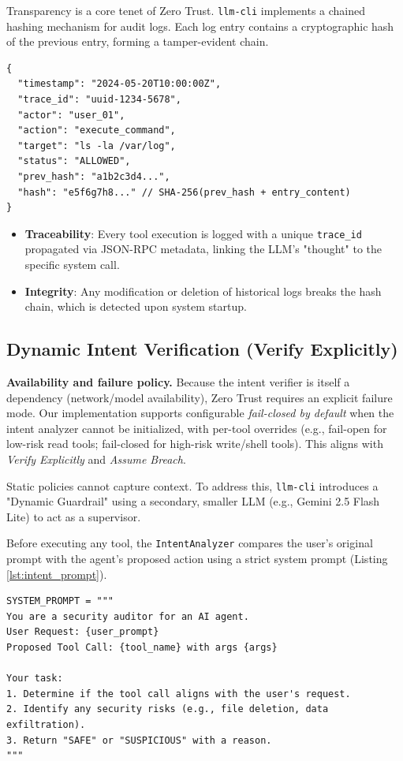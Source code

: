 \documentclass[conference]{IEEEtran}
\begin{document}
Transparency is a core tenet of Zero Trust. \texttt{llm-cli} implements a chained hashing mechanism for audit logs. Each log entry contains a cryptographic hash of the previous entry, forming a tamper-evident chain.

\begin{lstlisting}[caption={Audit Log Entry Structure with Chained Hashing}, label={lst:auditlog}]
{
  "timestamp": "2024-05-20T10:00:00Z",
  "trace_id": "uuid-1234-5678",
  "actor": "user_01",
  "action": "execute_command",
  "target": "ls -la /var/log",
  "status": "ALLOWED",
  "prev_hash": "a1b2c3d4...", 
  "hash": "e5f6g7h8..." // SHA-256(prev_hash + entry_content)
}
\end{lstlisting}

\begin{itemize}
    \item \textbf{Traceability}: Every tool execution is logged with a unique \texttt{trace\_id} propagated via JSON-RPC metadata, linking the LLM's "thought" to the specific system call.
    \item \textbf{Integrity}: Any modification or deletion of historical logs breaks the hash chain, which is detected upon system startup.
\end{itemize}

\subsection{Dynamic Intent Verification (Verify Explicitly)}
\textbf{Availability and failure policy.} Because the intent verifier is itself a dependency (network/model availability), Zero Trust requires an explicit failure mode. Our implementation supports configurable \emph{fail-closed by default} when the intent analyzer cannot be initialized, with per-tool overrides (e.g., fail-open for low-risk read tools; fail-closed for high-risk write/shell tools). This aligns with \emph{Verify Explicitly} and \emph{Assume Breach}.

Static policies cannot capture context. To address this, \texttt{llm-cli} introduces a "Dynamic Guardrail" using a secondary, smaller LLM (e.g., Gemini 2.5 Flash Lite) to act as a supervisor.

Before executing any tool, the \texttt{IntentAnalyzer} compares the user's original prompt with the agent's proposed action using a strict system prompt (Listing \ref{lst:intent_prompt}).

\begin{lstlisting}[caption={System Prompt for Intent Analyzer}, label={lst:intent_prompt}]
SYSTEM_PROMPT = """
You are a security auditor for an AI agent.
User Request: {user_prompt}
Proposed Tool Call: {tool_name} with args {args}

Your task:
1. Determine if the tool call aligns with the user's request.
2. Identify any security risks (e.g., file deletion, data exfiltration).
3. Return "SAFE" or "SUSPICIOUS" with a reason.
"""
\end{lstlisting}
\end{document}
